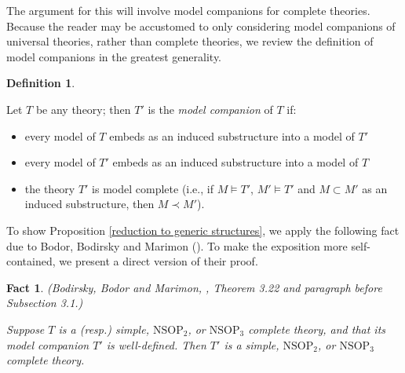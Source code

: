 \documentclass{amsart}
\newtheorem{fact}[theorem]{Fact}
\theoremstyle{definition}
\newtheorem{definition}[theorem]{Definition}
\theoremstyle{remark}
\numberwithin{equation}{section}
\begin{document}
The argument for this will involve model companions for complete theories. Because the reader may be accustomed to only considering model companions of universal theories, rather than complete theories, we review the definition of model companions in the greatest generality.

\begin{definition}
\label{general model companion}


Let $T$ be any theory; then $T'$ is the \textit{model companion} of $T$ if:


\begin{itemize}
    \item every model of $T$ embeds as an induced substructure into a model of $T'$

    \item every model of $T'$ embeds as an induced substructure into a model of $T$

    \item the theory $T'$ is model complete (i.e., if $M \models T'$, $M' \models T'$ and $M \subset M'$ as an induced substructure, then $M \prec M'$).
\end{itemize}


\end{definition}




To show Proposition \ref{reduction to generic structures}, we apply the following fact due to Bodor, Bodirsky and Marimon (\cite{BBM25}). To make the exposition more self-contained, we present a direct version of their proof.


\begin{fact}\emph{(Bodirsky, Bodor and Marimon, \cite{BBM25}, Theorem 3.22 and paragraph before Subsection 3.1.)}

\label{Bodirsky, Bodor and Marimon theorem}

Suppose $T$ is a (resp.) simple, $\mathrm{NSOP}_{2}$, or $\mathrm{NSOP}_{3}$ complete theory, and that its model companion $T'$ is well-defined. Then $T'$ is a simple, $\mathrm{NSOP}_{2}$, or $\mathrm{NSOP}_{3}$ complete theory.

    
\end{fact}
\end{document}

